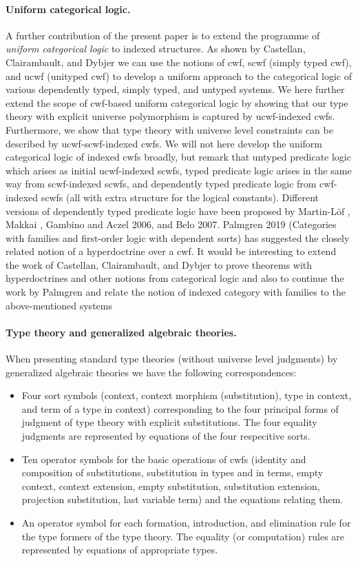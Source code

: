 \documentclass[11pt,a4paper]{article}
\theoremstyle{definition}
\begin{document}
\paragraph{Uniform categorical logic.} A further contribution of the present paper is to extend the programme of {\em uniform categorical logic} to indexed structures. As shown by Castellan, Clairambault, and Dybjer \cite{castellan:warsaw,CCD:lambek} we can use the notions of cwf, scwf (simply typed cwf), and ucwf (unityped cwf) to develop a uniform approach to the categorical logic of various dependently typed, simply typed, and untyped systems. We here further extend the scope of cwf-based uniform categorical logic by showing that our type theory with explicit universe polymorphism is captured by ucwf-indexed cwfs. Furthermore, we show that type theory with universe level constraints can be described by ucwf-scwf-indexed cwfs. We will not here develop the uniform categorical logic of indexed cwfs broadly, but remark that untyped predicate logic which arises as initial ucwf-indexed scwfs, typed predicate logic arises in the same way from scwf-indexed scwfs, and dependently typed predicate logic from cwf-indexed scwfs (all with extra structure for the logical constants). Different versions of dependently typed predicate logic have been proposed by Martin-Löf \cite{}, Makkai \cite{}, Gambino and Aczel 2006, and Belo 2007. Palmgren 2019 (Categories with families and first-order logic with dependent sorts) has suggested the closely related notion of a hyperdoctrine over a cwf. It would be interesting to extend the work of Castellan, Clairambault, and Dybjer \cite{castellan:warsaw,CCD:lambek} to prove theorems with hyperdoctrines and other notions from categorical logic and also to continue the work by Palmgren \cite{Palmgren19} and relate the notion of indexed category with families to the above-mentioned systems 

\paragraph{Type theory and generalized algebraic theories.} When presenting standard type theories (without universe level judgments) by generalized algebraic theories we have the following correspondences:
\begin{itemize}
\item Four sort symbols (context, context morphism (substitution), type in context, and term of a type in context) corresponding to the four principal forms of judgment of type theory with explicit substitutions. The four equality judgments are represented by equations of the four respecitive sorts.
\item Ten operator symbols for the basic operations of cwfs (identity and composition of substitutions, substitution in types and in terms, empty context, context extension, empty substitution, substitution extension, projection substitution, last variable term) and the equations relating them.
\item An operator symbol for each formation, introduction, and elimination rule for the type formers of the type theory. The equality (or computation) rules are represented by equations of appropriate types.
\end{itemize}
\end{document}
